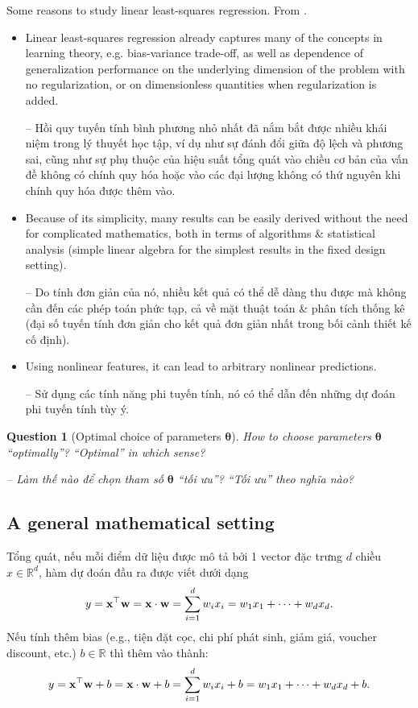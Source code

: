 \documentclass{article}
\newtheorem{question}{Question}
\begin{document}
{\sf Some reasons to study linear least-squares regression.} From \cite[Sect. 3.1, pp. 45--46]{Bach2024}.
\begin{itemize}
	\item Linear least-squares regression already captures many of the concepts in learning theory, e.g. bias-variance trade-off, as well as dependence of generalization performance on the underlying dimension of the problem with no regularization, or on dimensionless quantities when regularization is added.
	
	-- Hồi quy tuyến tính bình phương nhỏ nhất đã nắm bắt được nhiều khái niệm trong lý thuyết học tập, ví dụ như sự đánh đổi giữa độ lệch và phương sai, cũng như sự phụ thuộc của hiệu suất tổng quát vào chiều cơ bản của vấn đề không có chính quy hóa hoặc vào các đại lượng không có thứ nguyên khi chính quy hóa được thêm vào.
	\item Because of its simplicity, many results can be easily derived without the need for complicated mathematics, both in terms of algorithms \& statistical analysis (simple linear algebra for the simplest results in the fixed design setting).
	
	-- Do tính đơn giản của nó, nhiều kết quả có thể dễ dàng thu được mà không cần đến các phép toán phức tạp, cả về mặt thuật toán \& phân tích thống kê (đại số tuyến tính đơn giản cho kết quả đơn giản nhất trong bối cảnh thiết kế cố định).
	\item Using nonlinear features, it can lead to arbitrary nonlinear predictions.
	
	-- Sử dụng các tính năng phi tuyến tính, nó có thể dẫn đến những dự đoán phi tuyến tính tùy ý.
\end{itemize}

\begin{question}[Optimal choice of parameters $\boldsymbol{\theta}$]
	How to choose parameters $\boldsymbol{\theta}$ ``optimally''? ``Optimal'' in which sense?
	
	-- Làm thế nào để chọn tham số $\boldsymbol{\theta}$ ``tối ưu''? ``Tối ưu'' theo nghĩa nào?
\end{question}

\subsection{A general mathematical setting}
Tổng quát, nếu mỗi điểm dữ liệu được mô tả bởi 1 vector đặc trưng $d$ chiều $x\in\mathbb{R}^d$, hàm dự đoán đầu ra được viết dưới dạng
\begin{equation*}
	y = {\bf x}^\top{\bf w} = {\bf x}\cdot{\bf w} = \sum_{i=1}^d w_ix_i = w_1x_1 + \cdots + w_dx_d.
\end{equation*}
Nếu tính thêm bias (e.g., tiện đặt cọc, chi phí phát sinh, giảm giá, voucher discount, etc.) $b\in\mathbb{R}$ thì thêm vào thành:
\begin{equation*}
	y = {\bf x}^\top{\bf w} + b = {\bf x}\cdot{\bf w} + b = \sum_{i=1}^d w_ix_i + b = w_1x_1 + \cdots + w_dx_d + b.
\end{equation*}
\end{document}
